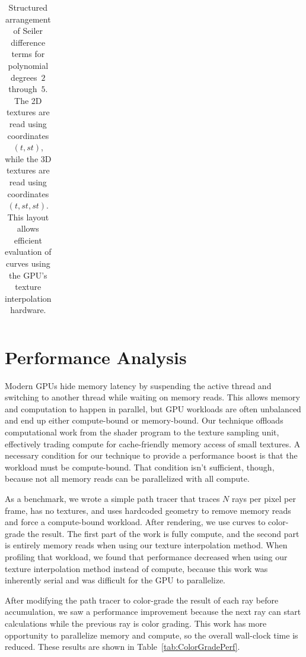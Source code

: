 \documentclass{jcgt}
\begin{document}
\begin{table}[t]
\begin{tabular}{|c|c|c|}
\end{tabular}

\caption{Structured arrangement of Seiler difference terms for polynomial degrees~$2$ through~$5$. The 2D textures are read using coordinates $(t, st)$, while the 3D textures are read using coordinates $(t, st, st)$. This layout allows efficient evaluation of curves using the GPU's texture interpolation hardware.}
\label{tab:SeilerLayout}
\end{table}

\section{Performance Analysis}

Modern GPUs hide memory latency by suspending the active thread and switching to another thread while waiting on memory reads. This allows memory and computation to happen in parallel, but GPU workloads are often unbalanced and end up either compute-bound or memory-bound. Our technique offloads
computational work from the shader program to the texture sampling unit, effectively trading compute for cache-friendly memory access of small textures. A necessary condition for our technique to provide a performance boost is that the workload must be compute-bound.
That condition isn't sufficient, though, because not all memory reads can be parallelized with all compute.

As a benchmark, we wrote a simple path tracer that traces $N$ rays per pixel per frame, has no textures, and uses hardcoded geometry to remove memory reads and force a compute-bound workload. After rendering, we use curves to color-grade the result. The first part of the work is fully compute, and the second part is entirely memory
reads when using our texture interpolation method. When profiling that workload, we found that performance decreased when using our texture interpolation method instead of compute, because this work was inherently serial and was difficult for the GPU to parallelize.

After modifying the path tracer to color-grade the result of each ray before accumulation, we saw a performance improvement because the next ray can start calculations while the previous ray is color grading. This work has more opportunity to parallelize memory and compute,
so the overall wall-clock time is reduced. These results are shown in Table~\ref{tab:ColorGradePerf}.
\end{document}
